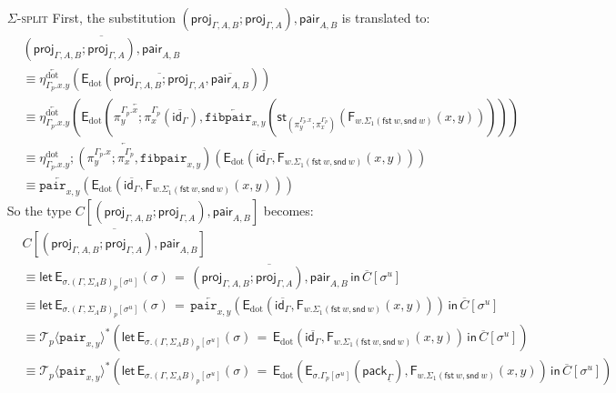 \documentclass[10pt]{article}
\theoremstyle{definition}
\newcommand\dsd[1]{\ensuremath{\mathsf{#1}}}
\newcommand{\app}[2]{\ensuremath{#1 \: #2}}
\newcommand{\fst}[1]{\app{\dsd{fst}}{#1}}
\newcommand{\snd}[1]{\app{\dsd{snd}}{#1}}
\newcommand{\id}{\mathsf{id}}
\newcommand{\rewrite}[2]{\overleftarrow{#1}(#2)}
\newcommand\St[2]{\ensuremath{{#1}^*(#2)}}
\newcommand\StI[2]{\ensuremath{\mathsf{st}_{#1}(#2)}}
\newcommand\FIs[2]{\ensuremath{\mathsf{F}_{#1}{(#2)}}}
\newcommand\EEs[4]{\ensuremath{\mathsf{let} \, \mathsf{E}_{#1}(#3) \, = \, {#2} \, \mathsf{in} \, #4}}
\newcommand\EIs[2]{\ensuremath{\mathsf{E}_{#1}{(#2)}}}
\newcommand\ApEl[2]{\mathcal{T}_{#1}\langle#2\rangle}
\newcommand\pack[1]{\ensuremath{\mathsf{pack}_{#1}}}
\newcommand\unp[2]{\ensuremath{{#2}^u}}
\newcommand{\modeof}[1]{{#1}_p}
\newcommand{\sdot}{\ensuremath{\mathrm{dot}}}
\newcommand{\upstairs}[1]{\overline{#1}}
\newcommand{\downstairs}[1]{\underline{#1}}
\newcommand\proj[1]{\ensuremath{\mathsf{proj}_{#1}}}
\newcommand\fibpair[1]{\ensuremath{\mathtt{fibpair}_{#1}}}
\newcommand\pair[1]{\ensuremath{\mathtt{pair}_{#1}}}
\newcommand\qpair[1]{\ensuremath{\mathsf{pair}_{#1}}}
\begin{document}
\begin{enumerate}[style = multiline, labelwidth = 80pt]
\item[\textsc{$\Sigma$-split}] 
First, the substitution $(\proj{\Gamma, A, B};\proj{\Gamma, A}), \qpair{A,B}$ is translated to:
\begin{align*}
&\upstairs{(\proj{\Gamma, A, B};\proj{\Gamma, A}), \qpair{A,B}} \\
&\equiv \rewrite{\eta^\sdot_{\modeof{\Gamma}.x.y}}{\EIs{\sdot}{\upstairs{\proj{\Gamma, A, B};\proj{\Gamma, A}}, \upstairs{\qpair{A,B}}}} \\
&\equiv \rewrite{\eta^\sdot_{\modeof{\Gamma}.x.y}}{\EIs{\sdot}{\rewrite{\pi^{\modeof{\Gamma}.x}_y;\pi^{\modeof{\Gamma}}_x}{\upstairs{\id_\Gamma}}, \rewrite{\fibpair{x,y}}{\StI{(\pi^{\modeof{\Gamma}.x}_y;\pi^{\modeof{\Gamma}}_x)}{\FIs{w. \Sigma_1(\fst w, \snd w)}{x,y}}}}} \\
&\equiv \rewrite{\eta^\sdot_{\modeof{\Gamma}.x.y};(\pi^{\modeof{\Gamma}.x}_y;\pi^{\modeof{\Gamma}}_x,\fibpair{x,y})}{\EIs{\sdot}{\upstairs{\id_\Gamma},\FIs{w. \Sigma_1(\fst w, \snd w)}{x,y}}} \\
&\equiv \rewrite{\pair{x,y}}{\EIs{\sdot}{\upstairs{\id_\Gamma},\FIs{w. \Sigma_1(\fst w, \snd w)}{x,y}}}
\end{align*}
So the type $C[(\proj{\Gamma, A, B};\proj{\Gamma, A}), \qpair{A,B}]$ becomes:
\begin{align*}
&\upstairs{C[(\proj{\Gamma, A, B};\proj{\Gamma, A}), \qpair{A,B}]} \\
&\equiv \EEs{\sigma.\modeof{(\Gamma, \Sigma_A B)}[\unp{\Gamma, \Sigma_A B}{\sigma}]}{\upstairs{(\proj{\Gamma, A, B};\proj{\Gamma, A}), \qpair{A,B}}}{\sigma}{\upstairs{C}[\unp{\Gamma, \Sigma_A B}{\sigma}]} \\
&\equiv \EEs{\sigma.\modeof{(\Gamma, \Sigma_A B)}[\unp{\Gamma, \Sigma_A B}{\sigma}]}{\rewrite{\pair{x,y}}{\EIs{\sdot}{\upstairs{\id_\Gamma},\FIs{w. \Sigma_1(\fst w, \snd w)}{x,y}}}}{\sigma}{\upstairs{C}[\unp{(\Gamma, \Sigma_A B)}{\sigma}]} \\
&\equiv \St{\ApEl{p}{\pair{x,y}}}{\EEs{\sigma.\modeof{(\Gamma, \Sigma_A B)}[\unp{\Gamma, \Sigma_A B}{\sigma}]}{\EIs{\sdot}{\upstairs{\id_\Gamma},\FIs{w. \Sigma_1(\fst w, \snd w)}{x,y}}}{\sigma}{\upstairs{C}[\unp{\Gamma, \Sigma_A B}{\sigma}]}} \\
&\equiv \St{\ApEl{p}{\pair{x,y}}}{\EEs{\sigma.\modeof{(\Gamma, \Sigma_A B)}[\unp{\Gamma, \Sigma_A B}{\sigma}]}{\EIs{\sdot}{\EIs{\sigma.\modeof{\Gamma}[\unp{\Gamma}{\sigma}]}{\pack{\downstairs{\Gamma}}},\FIs{w. \Sigma_1(\fst w, \snd w)}{x,y}}}{\sigma}{\upstairs{C}[\unp{\Gamma, \Sigma_A B}{\sigma}]}} \\

\end{align*}
\end{enumerate}
\end{document}

